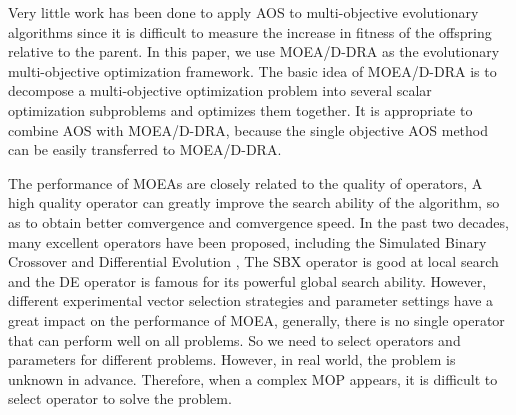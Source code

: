 \documentclass[journal]{IEEEtran}
\begin{document}
Very little work has been done to apply AOS to multi-objective evolutionary algorithms since it is difficult to measure the increase in fitness of the offspring relative to the parent.
% 
In this paper, we use MOEA/D-DRA \cite{moead-dra} as the evolutionary multi-objective optimization framework. The basic idea of MOEA/D-DRA is to decompose a multi-objective optimization problem into several scalar optimization subproblems and optimizes them together.
It is appropriate to combine AOS with MOEA/D-DRA, because the single objective AOS method can be easily transferred to MOEA/D-DRA.

The performance of MOEAs are closely related to the quality of operators, A high quality operator can greatly improve the search ability of the algorithm, so as to obtain better comvergence and comvergence speed.
In the past two decades, many excellent operators have been proposed, including the Simulated Binary Crossover \cite{deb2006reference} and Differential Evolution \cite{storn1997differential}, The SBX operator is good at local search and the DE operator is famous for its powerful global search ability.
However, different experimental vector selection strategies and parameter settings have a great impact on the performance of MOEA, generally, there is no single operator that can perform well on all problems.
So we need to select operators and parameters for different problems. However, in real world, the problem is unknown in advance. Therefore, when a complex MOP appears, it is difficult to select operator to solve the problem.
\end{document}
